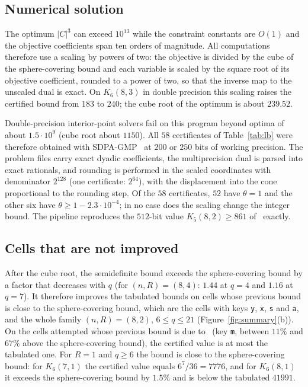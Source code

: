 \documentclass[11pt]{amsart}
\newcommand{\Kq}[3]{K_{#1}(#2,#3)}
\begin{document}
\subsection{Numerical solution}\label{sec:lb:numerics}

The optimum $|C|^3$ can exceed $10^{13}$ while the constraint constants are
$O(1)$ and the objective coefficients span ten orders of magnitude. All
computations therefore use a scaling by powers of two: the objective is
divided by the cube of the sphere-covering bound and each variable is
scaled by the square root of its objective coefficient, rounded to a power
of two, so that the inverse map to the unscaled dual is exact. On
$\Kq{6}{8}{3}$ in double precision this scaling raises the certified bound
from $183$ to $240$; the cube root of the optimum is about $239.52$.

Double-precision interior-point solvers fail on this program beyond optima
of about $1.5\cdot 10^9$ (cube root about $1150$). All $58$ certificates
of Table~\ref{tab:lb} were therefore obtained with SDPA-GMP~\cite{sdpagmp}
at $200$ or $250$ bits of working precision. The problem files carry exact
dyadic coefficients, the multiprecision dual is parsed into exact
rationals, and rounding is performed in the scaled coordinates with
denominator $2^{128}$ (one certificate: $2^{64}$), with the displacement
into the cone proportional to the rounding step. Of the $58$ certificates,
$52$ have $\theta=1$ and the other six have $\theta\ge 1-2.3\cdot
10^{-4}$; in no case does the scaling change the integer bound. The
pipeline reproduces the $512$-bit value $\Kq{5}{8}{2}\ge 861$
of~\cite{GijswijtPolak} exactly.

\subsection{Cells that are not improved}\label{sec:lb:limits}

After the cube root, the semidefinite bound exceeds the sphere-covering
bound by a factor that decreases with $q$ (for $(n,R)=(8,4)$: $1.44$ at
$q=4$ and $1.16$ at $q=7$). It therefore improves the tabulated bounds on
cells whose previous bound is close to the sphere-covering bound, which
are the cells with keys \texttt{y}, \texttt{x}, \texttt{s} and \texttt{a},
and the whole family $(n,R)=(8,2)$, $6\le q\le 21$
(Figure~\ref{fig:summary}(b)). On the cells attempted whose previous bound
is due to~\cite{HHSP2009} (key \texttt{m}, between $11\%$ and $67\%$ above
the sphere-covering bound), the certified value is at most the tabulated
one. For $R=1$ and $q\ge 6$ the bound is close to the sphere-covering
bound: for $\Kq{6}{7}{1}$ the certified value equals $6^7/36=7776$, and
for $\Kq{6}{8}{1}$ it exceeds the sphere-covering bound by $1.5\%$ and is
below the tabulated $41991$.
\end{document}
